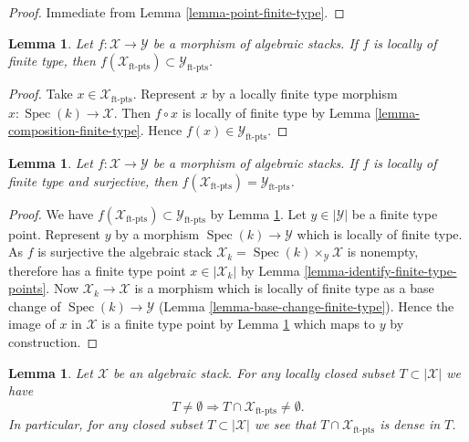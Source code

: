 \documentclass{stacks-project}
\theoremstyle{plain}
\newtheorem{lemma}[subsection]{Lemma}
\theoremstyle{definition}
\theoremstyle{remark}
\numberwithin{equation}{subsection}
\def\Spec{\mathop{\mathrm{Spec}}}
\begin{document}
\begin{proof}
Immediate from
Lemma \ref{lemma-point-finite-type}.
\end{proof}

\begin{lemma}
\label{lemma-finite-type-points-morphism}
Let $f : \mathcal{X} \to \mathcal{Y}$ be a morphism of algebraic stacks.
If $f$ is locally of finite type, then
$f(\mathcal{X}_{\text{ft-pts}}) \subset \mathcal{Y}_{\text{ft-pts}}$.
\end{lemma}

\begin{proof}
Take $x \in \mathcal{X}_{\text{ft-pts}}$. Represent $x$ by a locally
finite type morphism $x : \Spec(k) \to \mathcal{X}$. Then
$f \circ x$ is locally of finite type by
Lemma \ref{lemma-composition-finite-type}.
Hence $f(x) \in \mathcal{Y}_{\text{ft-pts}}$.
\end{proof}

\begin{lemma}
\label{lemma-finite-type-points-surjective-morphism}
Let $f : \mathcal{X} \to \mathcal{Y}$ be a morphism of algebraic stacks.
If $f$ is locally of finite type and surjective, then
$f(\mathcal{X}_{\text{ft-pts}}) = \mathcal{Y}_{\text{ft-pts}}$.
\end{lemma}

\begin{proof}
We have $f(\mathcal{X}_{\text{ft-pts}}) \subset \mathcal{Y}_{\text{ft-pts}}$ by
Lemma \ref{lemma-finite-type-points-morphism}.
Let $y \in |\mathcal{Y}|$ be a finite type point. Represent $y$ by a morphism
$\Spec(k) \to \mathcal{Y}$ which is locally of finite type.
As $f$ is surjective the algebraic stack
$\mathcal{X}_k = \Spec(k) \times_\mathcal{Y} \mathcal{X}$ is nonempty,
therefore has a finite type point $x \in |\mathcal{X}_k|$ by
Lemma \ref{lemma-identify-finite-type-points}.
Now $\mathcal{X}_k \to \mathcal{X}$ is a morphism which is locally of finite
type as a base change of $\Spec(k) \to \mathcal{Y}$
(Lemma \ref{lemma-base-change-finite-type}).
Hence the image of $x$ in $\mathcal{X}$ is a finite type point by
Lemma \ref{lemma-finite-type-points-morphism}
which maps to $y$ by construction.
\end{proof}

\begin{lemma}
\label{lemma-enough-finite-type-points}
Let $\mathcal{X}$ be an algebraic stack.
For any locally closed subset $T \subset |\mathcal{X}|$ we have
$$
T \not = \emptyset
\Rightarrow
T \cap \mathcal{X}_{\text{ft-pts}} \not = \emptyset.
$$
In particular, for any closed subset $T \subset |\mathcal{X}|$ we
see that $T \cap \mathcal{X}_{\text{ft-pts}}$ is dense in $T$.
\end{lemma}
\end{document}
